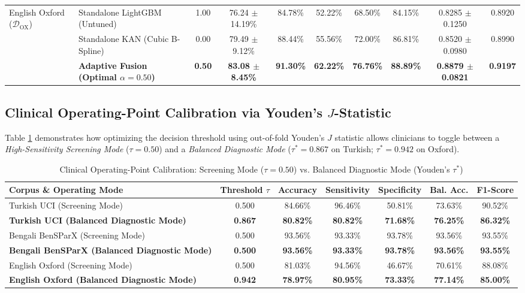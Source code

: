 \documentclass[journal,10pt,twoside]{IEEEtran}
\begin{document}
\begin{table}[t]
\begin{tabular}{llcccccccc}
\midrule
\multirow{4}{*}{English Oxford ($\mathcal{D}_{\text{OX}}$)} 
& Standalone LightGBM (Untuned) & 1.00 & 76.24 $\pm$ 14.19\% & 84.78\% & 52.22\% & 68.50\% & 84.15\% & 0.8285 $\pm$ 0.1250 & 0.8920 \\
& Standalone KAN (Cubic B-Spline) & 0.00 & 79.49 $\pm$ 9.12\% & 88.44\% & 55.56\% & 72.00\% & 86.81\% & 0.8520 $\pm$ 0.0980 & 0.8990 \\
& \textbf{Adaptive Fusion (Optimal $\alpha=0.50$)} & \textbf{0.50} & \textbf{83.08 $\pm$ 8.45\%} & \textbf{91.30\%} & \textbf{62.22\%} & \textbf{76.76\%} & \textbf{88.89\%} & \textbf{0.8879 $\pm$ 0.0821} & \textbf{0.9197} \\
\bottomrule
\end{tabular}
\end{table}

\subsection{Clinical Operating-Point Calibration via Youden's $J$-Statistic}
Table \ref{tab:calibration} demonstrates how optimizing the decision threshold using out-of-fold Youden's $J$ statistic allows clinicians to toggle between a \textit{High-Sensitivity Screening Mode} ($\tau = 0.50$) and a \textit{Balanced Diagnostic Mode} ($\tau^* = 0.867$ on Turkish; $\tau^* = 0.942$ on Oxford).

\begin{table}[h]
\caption{Clinical Operating-Point Calibration: Screening Mode ($\tau = 0.50$) vs. Balanced Diagnostic Mode (Youden's $\tau^*$)}
\label{tab:calibration}
\centering
\scriptsize
\begin{tabular}{lcccccc}
\toprule
\textbf{Corpus \& Operating Mode} & \textbf{Threshold $\tau$} & \textbf{Accuracy} & \textbf{Sensitivity} & \textbf{Specificity} & \textbf{Bal. Acc.} & \textbf{F1-Score} \\
\midrule
Turkish UCI (Screening Mode) & 0.500 & 84.66\% & 96.46\% & 50.81\% & 73.63\% & 90.52\% \\
\textbf{Turkish UCI (Balanced Diagnostic Mode)} & \textbf{0.867} & \textbf{80.82\%} & \textbf{80.82\%} & \textbf{71.68\%} & \textbf{76.25\%} & \textbf{86.32\%} \\
Bengali BenSParX (Screening Mode) & 0.500 & 93.56\% & 93.33\% & 93.78\% & 93.56\% & 93.55\% \\
\textbf{Bengali BenSParX (Balanced Diagnostic Mode)} & \textbf{0.500} & \textbf{93.56\%} & \textbf{93.33\%} & \textbf{93.78\%} & \textbf{93.56\%} & \textbf{93.55\%} \\
English Oxford (Screening Mode) & 0.500 & 81.03\% & 94.56\% & 46.67\% & 70.61\% & 88.08\% \\
\textbf{English Oxford (Balanced Diagnostic Mode)} & \textbf{0.942} & \textbf{78.97\%} & \textbf{80.95\%} & \textbf{73.33\%} & \textbf{77.14\%} & \textbf{85.00\%} \\
\bottomrule
\end{tabular}
\end{table}
\end{document}
